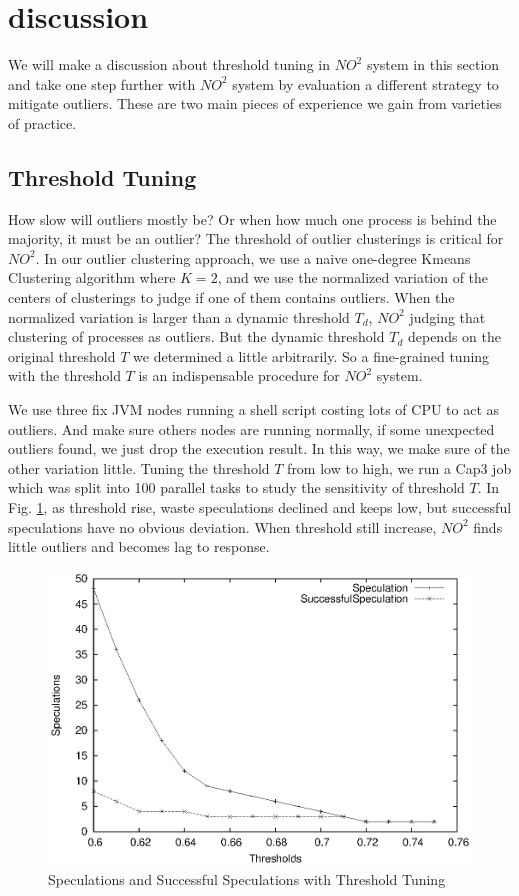 \section{discussion}

We will make a discussion about threshold tuning in $NO^2$ system in this section and take one step further with $NO^2$ system by evaluation a different strategy to mitigate outliers. These are two main pieces of experience we gain from varieties of practice.

\subsection{Threshold Tuning}

How slow will outliers mostly be? Or when how much one process is behind the majority, it must be an outlier? The threshold of outlier clusterings is critical for $NO^2$. In our outlier clustering approach, we use a naive one-degree Kmeans Clustering algorithm where $K = 2$, and we use the normalized variation of the centers of clusterings to judge if one of them contains outliers. When the normalized variation is larger than a dynamic threshold $T_d$, $NO^2$ judging that clustering of processes as outliers. But the dynamic threshold $T_d$ depends on the original threshold $T$ we determined a little arbitrarily. So a fine-grained tuning with the threshold $T$ is an indispensable procedure for $NO^2$ system.

We use three fix JVM nodes running a shell script costing lots of CPU to act as outliers. And make sure others nodes are running normally, if some unexpected outliers found, we just drop the execution result. In this way, we make sure of the other variation little. Tuning the threshold $T$ from low to high, we run a Cap3 job which was split into 100 parallel tasks to study the sensitivity of threshold $T$. In Fig. \ref{figure:thresholdtuning}, as threshold rise, waste speculations declined and keeps low, but successful speculations have no obvious deviation. When threshold still increase, $NO^2$ finds little outliers and becomes lag to response.

\begin{figure}
\centering
\includegraphics[width=0.9\columnwidth]{figures/threshold&speculation.eps}
\caption{Speculations and Successful Speculations with Threshold Tuning}
\label{figure:thresholdtuning}
\end{figure}

